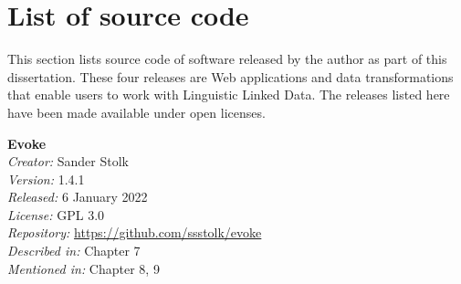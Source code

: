 \section*{List of source code}
\label{fm:sourcecode}

This section lists source code of software released by the author as part of this dissertation. These four releases are Web applications and data transformations that enable users to work with Linguistic Linked Data. The releases listed here have been made available under open licenses.

\bigskip





\noindent
\textbf{Evoke} \\
\textit{Creator:} Sander Stolk \\
\textit{Version:} 1.4.1 \\
\textit{Released:} 6 January 2022 \\
\textit{License:} GPL 3.0 \\
\textit{Repository:} \url{https://github.com/ssstolk/evoke} \\
\textit{Described in:} Chapter 7 \\
\textit{Mentioned in:} Chapter 8, 9 \\


